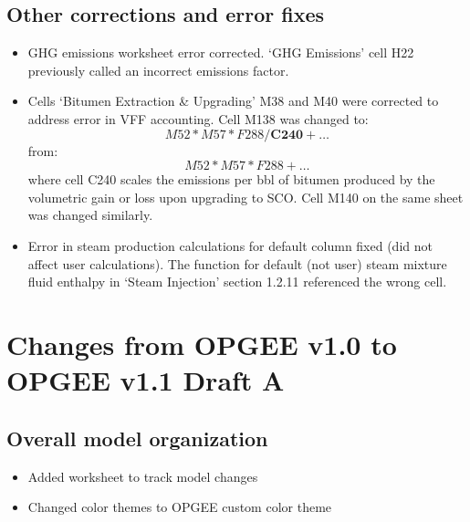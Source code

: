 \documentclass[11pt]{report}
\begin{document}
\subsection{Other corrections and error fixes} 

\begin{itemize} 
\item GHG emissions worksheet error corrected. `GHG Emissions' cell H22 previously called an incorrect emissions factor. \item Cells `Bitumen Extraction \& Upgrading' M38 and M40 were corrected to address error in VFF accounting. Cell M138 was changed to:
\begin{equation}
M52*M57*F288/\textbf{C240}+\ldots
\end{equation}
from:
\begin{equation}
M52*M57*F288+\ldots
\end{equation}
where cell C240 scales the emissions per bbl of bitumen produced by the volumetric gain or loss upon upgrading to SCO. Cell M140 on the same sheet was changed similarly.
\item Error in steam production calculations for default column fixed (did not affect user calculations). The function for default (not user) steam mixture fluid enthalpy in `Steam Injection' section 1.2.11 referenced the wrong cell. 

\end{itemize} 







\section{Changes from OPGEE v1.0 to OPGEE v1.1 Draft A}


\subsection{Overall model organization}
\begin{itemize}
\item{Added worksheet to track model changes}
\item{Changed color themes to OPGEE custom color theme}
\end{itemize}
\end{document}
